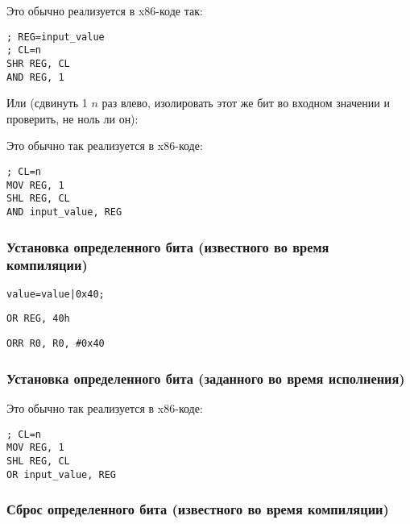 Это обычно реализуется в x86-коде так:

\begin{lstlisting}[caption=x86]
; REG=input_value
; CL=n
SHR REG, CL
AND REG, 1
\end{lstlisting}

Или (сдвинуть 1 $n$ раз влево, изолировать этот же бит во входном значении и проверить, не ноль ли он):



Это обычно так реализуется в x86-коде:

\begin{lstlisting}[caption=x86]
; CL=n
MOV REG, 1
SHL REG, CL
AND input_value, REG
\end{lstlisting}

\subsubsection{Установка определенного бита (известного во время компиляции)}

\begin{lstlisting}[caption=\CCpp]
value=value|0x40;
\end{lstlisting}

\begin{lstlisting}[caption=x86]
OR REG, 40h
\end{lstlisting}

\begin{lstlisting}[caption=ARM (\ARMMode) и ARM64]
ORR R0, R0, #0x40
\end{lstlisting}

\subsubsection{Установка определенного бита (заданного во время исполнения)}



Это обычно так реализуется в x86-коде:

\begin{lstlisting}[caption=x86]
; CL=n
MOV REG, 1
SHL REG, CL
OR input_value, REG
\end{lstlisting}

\subsubsection{Сброс определенного бита (известного во время компиляции)}

